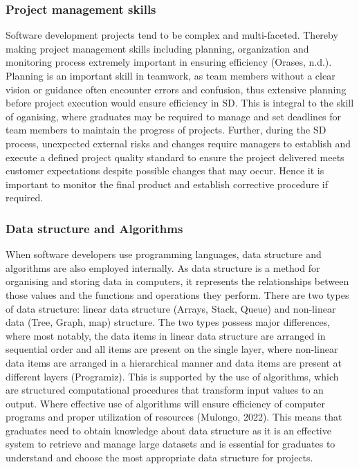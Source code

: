 \documentclass[a4paper, 11pt]{report}
\begin{document}
\subsubsection{Project management skills}
Software development projects tend to be complex and multi-faceted. Thereby making project management skills including planning, organization and monitoring process extremely important in ensuring efficiency (Orases, n.d.). Planning is an important skill in teamwork, as team members without a clear vision or guidance often encounter errors and confusion, thus extensive planning before project execution would ensure efficiency in SD. This is integral to the skill of oganising, where graduates may be required to manage and set deadlines for team members to maintain the progress of projects. Further, during the SD process, unexpected external risks and changes require managers to establish and execute a defined project quality standard to ensure the project delivered meets customer expectations despite possible changes that may occur. Hence it is important to monitor the final product and establish corrective procedure if required.
 
\subsubsection{Data structure and Algorithms}
When software developers use programming languages, data structure and algorithms are also employed internally. As data structure is a method for organising and storing data in computers, it represents the relationships between those values and the functions and operations they perform. There are two types of data structure: linear data structure (Arrays, Stack, Queue) and non-linear data (Tree, Graph, map) structure. The two types possess major differences, where most notably, the data items in linear data structure are arranged in sequential order and all items are present on the single layer, where non-linear data items are arranged in a hierarchical manner and data items are present at different layers (Programiz). This is supported by the use of algorithms, which are structured computational procedures that transform input values to an output. Where effective use of algorithms will ensure efficiency of computer programs and proper utilization of resources (Mulongo, 2022). This means that graduates need to obtain knowledge about data structure as it is an effective system to retrieve and manage large datasets and is essential for graduates to understand and choose the most appropriate data structure for projects. 
\end{document}

